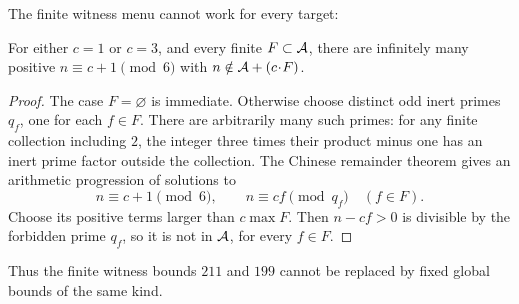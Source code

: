 The finite witness menu cannot work for every target:

\begin{proposition}\label{prop:no-finite-menu}
For either $c=1$ or $c=3$, and every finite $F\subset\AA$, there are
infinitely many positive $n\equiv c+1\pmod6$ with
$n\notin\AA+(c\!\cdot\! F)$.
\end{proposition}
\begin{proof}
The case $F=\varnothing$ is immediate. Otherwise choose distinct odd
inert primes $q_f$, one for each $f\in F$. There are arbitrarily many
such primes: for any finite collection including $2$, the integer three
times their product minus one has an inert prime factor outside the
collection. The Chinese remainder theorem gives an arithmetic progression
of solutions to
\[
n\equiv c+1\pmod6,\qquad n\equiv cf\pmod{q_f}\quad(f\in F).
\]
Choose its positive terms larger than $c\max F$. Then $n-cf>0$ is
divisible by the forbidden prime $q_f$, so it is not in $\AA$, for every
$f\in F$.
\end{proof}
Thus the finite witness bounds $211$ and $199$ cannot be replaced by
fixed global bounds of the same kind.

